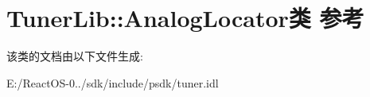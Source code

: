 \hypertarget{class_tuner_lib_1_1_analog_locator}{}\section{Tuner\+Lib\+:\+:Analog\+Locator类 参考}
\label{class_tuner_lib_1_1_analog_locator}


该类的文档由以下文件生成\+:\begin{DoxyCompactItemize}
\item 
E\+:/\+React\+O\+S-\/0../sdk/include/psdk/tuner.\+idl\end{DoxyCompactItemize}
